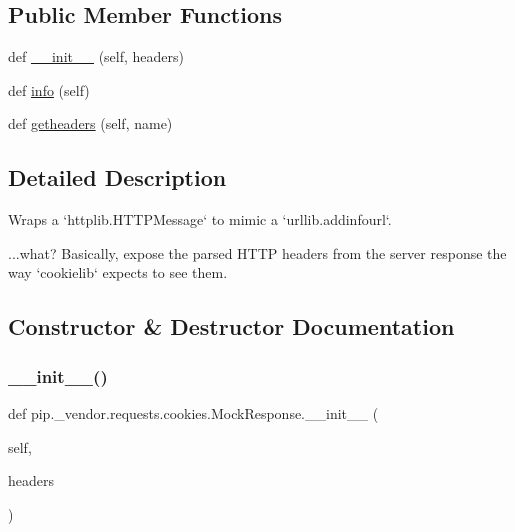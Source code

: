 \subsection*{Public Member Functions}
\begin{DoxyCompactItemize}
\item 
def \hyperlink{classpip_1_1__vendor_1_1requests_1_1cookies_1_1MockResponse_ab3b7cdefa34a2886122ab188cd243057}{\+\_\+\+\_\+init\+\_\+\+\_\+} (self, headers)
\item 
def \hyperlink{classpip_1_1__vendor_1_1requests_1_1cookies_1_1MockResponse_a6057235d2da9c755a933bb53334868cc}{info} (self)
\item 
def \hyperlink{classpip_1_1__vendor_1_1requests_1_1cookies_1_1MockResponse_a05847552ba8ec8f478c3aae7d902c7a6}{getheaders} (self, name)
\end{DoxyCompactItemize}


\subsection{Detailed Description}
\begin{DoxyVerb}Wraps a `httplib.HTTPMessage` to mimic a `urllib.addinfourl`.

...what? Basically, expose the parsed HTTP headers from the server response
the way `cookielib` expects to see them.
\end{DoxyVerb}
 

\subsection{Constructor \& Destructor Documentation}
\mbox{\label{classpip_1_1__vendor_1_1requests_1_1cookies_1_1MockResponse_ab3b7cdefa34a2886122ab188cd243057}} 
\subsubsection{\texorpdfstring{\+\_\+\+\_\+init\+\_\+\+\_\+()}{\_\_init\_\_()}}
{\footnotesize\ttfamily def pip.\+\_\+vendor.\+requests.\+cookies.\+Mock\+Response.\+\_\+\+\_\+init\+\_\+\+\_\+ (\begin{DoxyParamCaption}\item[{}]{self,  }\item[{}]{headers }\end{DoxyParamCaption})}

